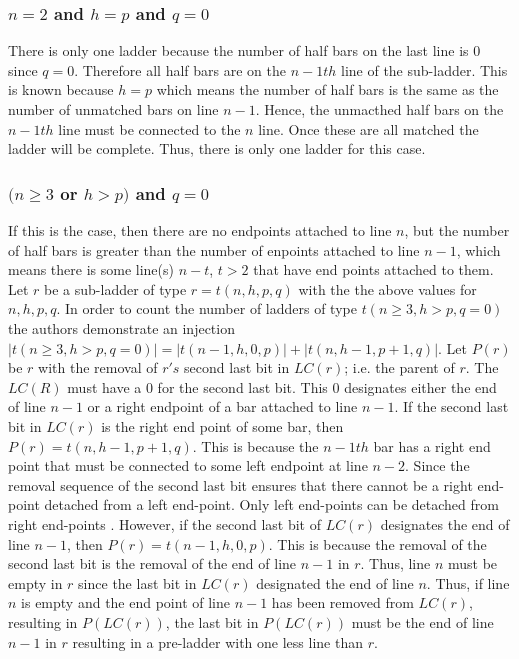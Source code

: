 \subsubsection{$n=2$ and $h=p$ and $q=0$}
There is only one ladder because the number of half bars 
on the last line is 0 since $q=0$. Therefore all half bars are on the 
$n-1th$ line of the sub-ladder. This is known because 
$h=p$ which means the number of half bars is the same as 
the number of unmatched bars on line $n-1$. Hence, the unmacthed 
half bars on the $n-1th$ line must be connected to the $n$ 
line. Once these are all matched the ladder will be complete. 
Thus, there is only one ladder for this case.

\subsubsection{$(n \geq 3$ or $h>p)$ and $q=0$}
If this is the case, then there are no endpoints attached to 
line $n$, but the number of half bars is greater than the 
number of enpoints attached to line $n-1$, which means there is 
some line(s) $n-t$, $t>2$ that have end points attached to them.
Let $r$ be a sub-ladder of type $r=t(n,h,p,q)$
with the the above values for $n,h,p,q$. In order to count the number of ladders of type 
$t(n\geq3, h>p, q=0)$ the authors demonstrate an injection $|t(n\geq3, h>p, q=0)|=|t(n-1,h,0,p)| + |t(n,h-1,p+1,q)|$.\cite{A6}
Let $P(r)$ be $r$ with the removal of $r's$ second last bit in $LC(r)$; i.e. the parent of 
$r$.  The $LC(R)$ must have a $0$ for the second last bit. This $0$ designates either the 
end of line $n-1$ or a right endpoint of a bar attached to line $n-1$. 
If the second last bit in $LC(r)$ is the right end point of some 
bar, then $P(r)=t(n,h-1,p+1,q)$. This is because the $n-1th$ bar 
has a right end point that must be connected to some left  
endpoint at line $n-2$. Since the removal sequence of the second 
last bit ensures that there cannot be a right end-point detached 
from a left end-point. Only left end-points can be detached 
from right end-points \cite{A6}. However, if the second last bit 
of $LC(r)$ designates the end of line $n-1$, then $P(r)=t(n-1,h,0,p)$. 
This is because the removal of the second last bit 
is the removal of the end of line $n-1$ in $r$. Thus, 
line $n$ must be empty in $r$ since the last bit in $LC(r)$
designated the end of line $n$. Thus, if line $n$ is empty 
and the end point of line $n-1$ has been removed from $LC(r)$, 
resulting in $P(LC(r))$, the last bit in $P(LC(r))$ must be 
the end of line $n-1$ in $r$ resulting in a pre-ladder with one 
less line than $r$.\par  


